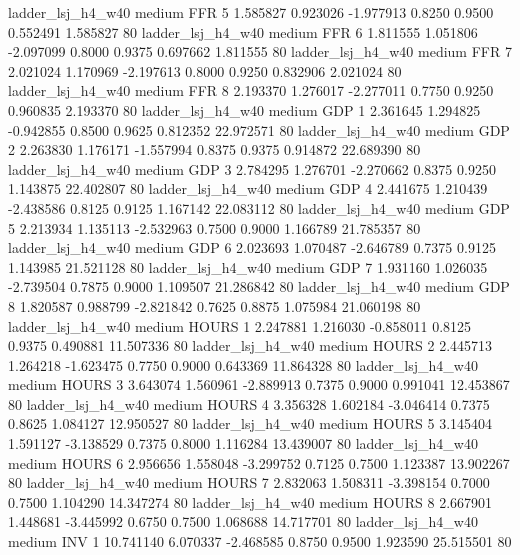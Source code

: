      ladder_lsj_h4_w40     medium      FFR                 5  1.585827 0.923026 -1.977913 0.8250 0.9500  0.552491    1.585827 80
     ladder_lsj_h4_w40     medium      FFR                 6  1.811555 1.051806 -2.097099 0.8000 0.9375  0.697662    1.811555 80
     ladder_lsj_h4_w40     medium      FFR                 7  2.021024 1.170969 -2.197613 0.8000 0.9250  0.832906    2.021024 80
     ladder_lsj_h4_w40     medium      FFR                 8  2.193370 1.276017 -2.277011 0.7750 0.9250  0.960835    2.193370 80
     ladder_lsj_h4_w40     medium      GDP                 1  2.361645 1.294825 -0.942855 0.8500 0.9625  0.812352   22.972571 80
     ladder_lsj_h4_w40     medium      GDP                 2  2.263830 1.176171 -1.557994 0.8375 0.9375  0.914872   22.689390 80
     ladder_lsj_h4_w40     medium      GDP                 3  2.784295 1.276701 -2.270662 0.8375 0.9250  1.143875   22.402807 80
     ladder_lsj_h4_w40     medium      GDP                 4  2.441675 1.210439 -2.438586 0.8125 0.9125  1.167142   22.083112 80
     ladder_lsj_h4_w40     medium      GDP                 5  2.213934 1.135113 -2.532963 0.7500 0.9000  1.166789   21.785357 80
     ladder_lsj_h4_w40     medium      GDP                 6  2.023693 1.070487 -2.646789 0.7375 0.9125  1.143985   21.521128 80
     ladder_lsj_h4_w40     medium      GDP                 7  1.931160 1.026035 -2.739504 0.7875 0.9000  1.109507   21.286842 80
     ladder_lsj_h4_w40     medium      GDP                 8  1.820587 0.988799 -2.821842 0.7625 0.8875  1.075984   21.060198 80
     ladder_lsj_h4_w40     medium    HOURS                 1  2.247881 1.216030 -0.858011 0.8125 0.9375  0.490881   11.507336 80
     ladder_lsj_h4_w40     medium    HOURS                 2  2.445713 1.264218 -1.623475 0.7750 0.9000  0.643369   11.864328 80
     ladder_lsj_h4_w40     medium    HOURS                 3  3.643074 1.560961 -2.889913 0.7375 0.9000  0.991041   12.453867 80
     ladder_lsj_h4_w40     medium    HOURS                 4  3.356328 1.602184 -3.046414 0.7375 0.8625  1.084127   12.950527 80
     ladder_lsj_h4_w40     medium    HOURS                 5  3.145404 1.591127 -3.138529 0.7375 0.8000  1.116284   13.439007 80
     ladder_lsj_h4_w40     medium    HOURS                 6  2.956656 1.558048 -3.299752 0.7125 0.7500  1.123387   13.902267 80
     ladder_lsj_h4_w40     medium    HOURS                 7  2.832063 1.508311 -3.398154 0.7000 0.7500  1.104290   14.347274 80
     ladder_lsj_h4_w40     medium    HOURS                 8  2.667901 1.448681 -3.445992 0.6750 0.7500  1.068688   14.717701 80
     ladder_lsj_h4_w40     medium      INV                 1 10.741140 6.070337 -2.468585 0.8750 0.9500  1.923590   25.515501 80
